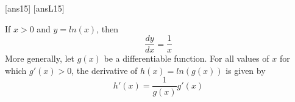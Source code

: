 \newpage
[ans15]
[ansL15]

\begin{tcolorbox}[title = {The Derivative of the Natural Logarithmic Function}{\hypersetup{linkcolor=white}\footnotemark}]

\noindent If $x>0$ and $y=ln(x)$, then
\begin{equation}\label{eq:dervNlog1}
\frac{dy}{dx}=\frac{1}{x}
\end{equation}
More generally, let $g(x)$ be a differentiable function. For all values of $x$ for which $g'(x)>0$, the derivative of $h(x)=ln(g(x))$ is given by
\begin{equation}\label{eq:dervNlog1}
h'(x)=\frac{1}{g(x)} g'(x)
\end{equation}

\end{tcolorbox}

